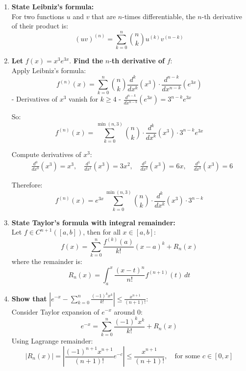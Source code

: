 \documentclass[12pt]{article}
\begin{document}
\begin{answerbox}
  \begin{enumerate}
    \item \textbf{State Leibniz's formula:} \\
    For two functions $ u $ and $ v $ that are $ n $-times differentiable, the $ n $-th derivative of their product is:
    $$
    (uv)^{(n)} = \sum_{k=0}^n \binom{n}{k} u^{(k)} v^{(n-k)}
    $$

    \item \textbf{Let } $ f(x) = x^3 e^{3x} $. \textbf{Find the } $ n $-\textbf{th derivative of } $ f $: \\
    Apply Leibniz's formula:
    $$
    f^{(n)}(x) = \sum_{k=0}^n \binom{n}{k} \frac{d^k}{dx^k}(x^3) \cdot \frac{d^{n-k}}{dx^{n-k}}(e^{3x})
    $$
    - Derivatives of $ x^3 $ vanish for $ k \geq 4 $
    - $ \frac{d^{n-k}}{dx^{n-k}}(e^{3x}) = 3^{n-k} e^{3x} $

    So:
    $$
    f^{(n)}(x) = \sum_{k=0}^{\min(n,3)} \binom{n}{k} \cdot \frac{d^k}{dx^k}(x^3) \cdot 3^{n-k} e^{3x}
    $$

    Compute derivatives of $ x^3 $:
    $$
    \begin{aligned}
    &\frac{d^0}{dx^0}(x^3) = x^3, \quad
    \frac{d^1}{dx^1}(x^3) = 3x^2, \quad
    \frac{d^2}{dx^2}(x^3) = 6x, \quad
    \frac{d^3}{dx^3}(x^3) = 6
    \end{aligned}
    $$

    Therefore:
    $$
    f^{(n)}(x) = e^{3x} \sum_{k=0}^{\min(n,3)} \binom{n}{k} \cdot \frac{d^k}{dx^k}(x^3) \cdot 3^{n-k}
    $$

    \item \textbf{State Taylor's formula with integral remainder:} \\
    Let $ f \in C^{n+1}([a,b]) $, then for all $ x \in [a,b] $:
    $$
    f(x) = \sum_{k=0}^n \frac{f^{(k)}(a)}{k!}(x-a)^k + R_n(x)
    $$
    where the remainder is:
    $$
    R_n(x) = \int_a^x \frac{(x-t)^n}{n!} f^{(n+1)}(t)\, dt
    $$

    \item \textbf{Show that } $ \left| e^{-x} - \sum_{k=0}^n \frac{(-1)^k x^k}{k!} \right| \leq \frac{x^{n+1}}{(n+1)!} $: \\
    Consider Taylor expansion of $ e^{-x} $ around 0:
    $$
    e^{-x} = \sum_{k=0}^n \frac{(-1)^k x^k}{k!} + R_n(x)
    $$
    Using Lagrange remainder:
    $$
    |R_n(x)| = \left| \frac{(-1)^{n+1} x^{n+1}}{(n+1)!} e^{-c} \right| \leq \frac{x^{n+1}}{(n+1)!}, \quad \text{for some } c \in [0,x]
    $$


\end{enumerate}
\end{answerbox}
\end{document}
